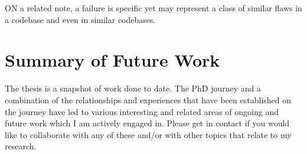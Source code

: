 ON a related note, a failure is specific yet may represent a class of similar flaws in a codebase and even in similar codebases. 

\section{Summary of Future Work}
The thesis is a snapshot of work done to date. The PhD journey and a combination of the relationships and experiences that have been established on the journey have led to various interesting and related areas of ongoing and future work which I am actively engaged in. Please get in contact if you would like to collaborate with any of these and/or with other topics that relate to my research.

